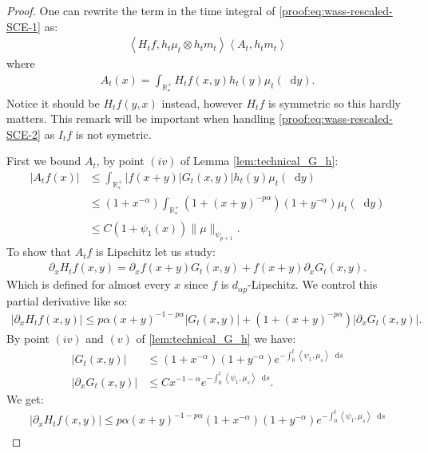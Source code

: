 \documentclass[11pt,a4paper]{article}
\newcommand{\RRP}{\mathbb{R}^+_*}
\newcommand{\brac}[1]{\left\langle#1\right\rangle}
\newcommand{\dd}{\mathop{}\!\mathrm{d}}
\begin{document}
\begin{proof}
    One can rewrite the term in the time integral of \eqref{proof:eq:wass-rescaled-SCE-1} as:
    \begin{align*}
        \brac{H_tf,h_t\mu_t \otimes h_t m_t} \brac{A_t,h_t m_t}
    \end{align*}
    where
    \begin{align*}
        A_t(x) = \int_{\RRP} H_tf(x,y) h_t(y) \mu_t(\dd y).
    \end{align*}    
    Notice it should be $H_tf(y,x)$ instead, however $H_tf$ is symmetric so this hardly matters. This remark will be important when handling \eqref{proof:eq:wass-rescaled-SCE-2} as $I_tf$ is not symetric. 
    
    First we bound $A_t$, by point $(iv)$ of Lemma \ref{lem:technical_G_h}:
    \begin{align*}
        \left|A_tf(x)\right| &\leq \int_{\RRP} |f(x+y)|G_t(x,y)| h_t(y)\mu_t(\dd y)\\
        &\leq (1 + x^{-\alpha})\int_{\RRP} (1 + (x+y)^{-p\alpha})(1 + y^{-\alpha})  \mu_t(\dd y) \\
        &\leq C(1 + \psi_1(x)) \| \mu\|_{\psi_{p+1}}.
    \end{align*}
    To show that  $A_tf$ is Lipschitz let us study:
    \begin{align*}
        \partial_x H_tf(x,y) = \partial_x f(x+y) G_t(x,y) + f(x+y) \partial_x G_t(x,y).
    \end{align*}
    Which is defined for almost every $x$ since $f$ is $d_{\alpha p}$-Lipschitz. We control this partial derivative like so:
    \begin{align*}
        \left|\partial_x H_tf(x,y) \right| \leq p\alpha (x+y)^{-1-p\alpha} \left|G_t(x,y) \right| + \left( 1 + (x+y)^{-p\alpha} \right) \left|\partial_x G_t(x,y) \right|.
    \end{align*}
    By point $(iv)$ and $(v)$ of \ref{lem:technical_G_h} we have:
    \begin{align*}
        \left|G_t(x,y) \right| &\leq (1 + x^{-\alpha})(1 + y^{-\alpha}) e^{-\int_0^t \brac{\psi_1,\mu_s}\dd s} \\
        \left|\partial_x G_t(x,y) \right| &\leq  C x^{-1-\alpha} e^{-\int_0^t \brac{\psi_1,\mu_s}\dd s}.
    \end{align*}
    We get:
    \begin{multline*}
        \left|\partial_x H_tf(x,y) \right| \leq p\alpha (x+y)^{-1-p\alpha} (1 + x^{-\alpha})(1 + y^{-\alpha})e^{-\int_0^t \brac{\psi_1,\mu_s}\dd s} \\

\end{multline*}
\end{proof}
\end{document}
